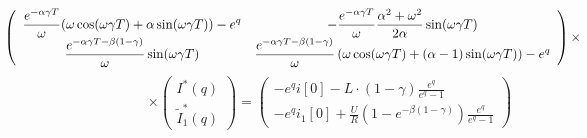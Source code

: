 \documentclass[a4paper,12pt]{article}
\begin{document}
$$
\hspace{-2cm}
\left(
\begin{array}{cc}
{\displaystyle \frac{e^{-\alpha\gamma T}}{\omega}(\omega\cos(\omega\gamma T) + \alpha\sin(\omega\gamma T)) - e^q} 
&
{\displaystyle -\frac{e^{-\alpha\gamma T}}{\omega}\frac{\alpha^2+\omega^2}{2\alpha}\sin(\omega\gamma T)}\\
{\displaystyle \frac{e^{-\alpha\gamma T - \beta(1-\gamma)}}{\omega}\sin(\omega\gamma T)}
&
{\displaystyle \frac{e^{-\alpha\gamma T - \beta(1-\gamma)}}{\omega}
	\left( \omega\cos(\omega\gamma T) + (\alpha -1)\sin(\omega\gamma T)\right)} - e^q
\end{array}
\right)\times
$$
$$
\times\left(
\begin{array}{c}
I^*(q)\\
\tilde{I}_1^*(q)
\end{array}
\right)=
\left(
\begin{array}{c}
{\displaystyle - e^qi[0] - L\cdot(1-\gamma)
	\frac{e^q}{e^q - 1}} \\[2.2mm]
{\displaystyle - e^q i_1[0] +
\frac{U}{R}\left(1- e^{-\beta(1-\gamma)} \right) \frac{e^q}{e^q-1}}
\end{array}
\right)
$$
\end{document}
